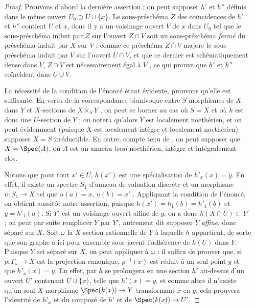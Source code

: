 \begin{proof}
Prouvons d'abord la dernière assertion ; on peut supposer $h'$ et $h''$ définis dans le même ouvert $U_0\supset U\cup\{x\}$.
Le sous-préschéma $Z$ des coïncidences de $h'$ et $h''$  contient $U$ et $x$, donc il y a un voisinage ouvert $V$ de $x$ dans $U_0$ tel que le sous-préschéma induit par $Z$ sur l'ouvert $Z\cap V$ soit un sous-préschéma \emph{fermé} du préschéma induit par $X$ sur $V$ ; comme ce préschéma $Z\cap V$ majore le sous-préschéma induit par $V$ sur l'ouvert $U\cap V$, et que ce dernier est schématiquement dense dans $V$, $Z\cap V$ est nécessairement égal à $V$ , ce qui prouve que $h'$ et $h''$ coïncident dans $U\cup V$.

La nécessité de la condition de l'énoncé étant évidente, prouvons qu'elle est suffisante.
En vertu de la correspondance biunivoque entre $S$-morphismes de $X$ dans $Y$ et $X$-sections de $X\times_S Y$ , on peut se borner au cas où $S=X$ et où $h$ est donc une $U$-section de $Y$ ; on notera qu'alors $Y$ est localement noethérien, et on peut évidemment (puisque $X$ est localement intègre et localement noethérien) supposer $X=S$ irréductible.
En outre, compte tenu de , on peut supposer que $X=\Spec(A)$, où $A$ est un anneau \emph{local} noethérien, intègre et intégralement clos.

Notons que pour tout $x'\in U$, $h(x')$ est une spécialisation de $h'_x(x)=y$.
En effet, il existe un spectre $S_1$ d'anneau de valuation discrète et un morphisme $u:S_1\to X$ tel que $u(a)=x$, $u(b)=x'$ .
Appliquant la condition de l'énoncé, on obtient aussitôt notre assertion, puisque $h(x')=h_1(b)=h'_1(b)$ et $y=h'_1(a)$.
Si $Y'$ est un voisinage ouvert affine de $y$, on a donc $h(X\cap U)\subset Y'$ ; on peut par suite remplacer $Y$ par $Y'$, autrement dit supposer $Y$ \emph{affine}, donc séparé sur $X$.
Soit $\omega$ la $X$-section rationnelle de $Y$ à laquelle $h$ appartient, de sorte que son graphe a ici pour ensemble sous-jacent l'adhérence de $h(U)$ dans $Y$.
Puisque $Y$ est séparé sur $X$, on peut appliquer  à $\omega$ : il suffira de prouver que, si $p:\Gamma_\omega\to X$ est la projection canonique, $p^{-1}(x)$ est réduit à un seul point $y$ et que $h'_x(x)=y$.
En effet, par  $h$ se prolongera en une section $h'$ au-dessus d'un ouvert $U'$ contenant $U\cup\{x\}$, telle que $h'(x)=y$, et comme alors il n'existe qu'un seul $X$-morphisme $\Spec(k(x))\to Y$ transformant $x$ en $y$, cela prouvera l'identité de $h'_x$ et du composé de $h'$ et de $\Spec(k(x))\to U'$.


\end{proof}
